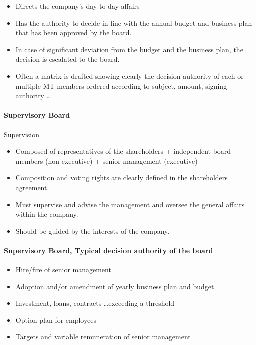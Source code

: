 \begin{itemize}
    \item Directs the company's day-to-day affairs
    \item Has the authority to decide in line with the annual budget and business
        plan that has been approved by the board.
    \item In case of significant deviation from the budget and the business plan,
        the decision is escalated to the board.
    \item Often a matrix is drafted showing clearly the decision authority
        of each or multiple MT members ordered according to subject, amount,
        signing authority \dots
\end{itemize}

\paragraph{Supervisory Board} Supervision

\begin{itemize}
    \item Composed of representatives of the shareholders + independent board
        members (non-executive) + senior management (executive)
    \item Composition and voting rights are clearly defined in the shareholders
        agreement.
    \item Must supervise and advise the management and oversee the general affairs
        within the company.
    \item Should be guided by the interests of the company.
\end{itemize}

\paragraph{Supervisory Board, Typical decision authority of the board}

\begin{itemize}
    \item Hire/fire of senior management
    \item Adoption and/or amendment of yearly business plan and budget
    \item Investment, loans, contracts \dots exceeding a threshold
    \item Option plan for employees
    \item Targets and variable remuneration of senior management
\end{itemize}

